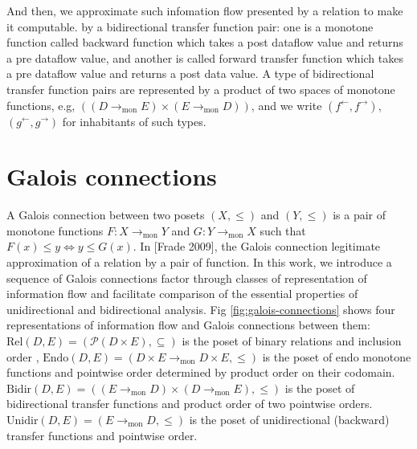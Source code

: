 \documentclass{easychair}
\theoremstyle{definition}
\newcommand{\Pow}{\mathcal{P}}
\newcommand{\Rel}{\mathrm{Rel}}
\newcommand{\Endo}{\mathrm{Endo}}
\newcommand{\Bidir}{\mathrm{Bidir}}
\newcommand{\Unidir}{\mathrm{Unidir}}
\newcommand{\tomon}{\to_{\mathrm{mon}}}
\newcommand{\ff}{{f^{\rightarrow}}}
\newcommand{\fb}{{f^{\leftarrow}}}
\newcommand{\gf}{{g^{\rightarrow}}}
\newcommand{\gb}{{g^{\leftarrow}}}
\begin{document}
And then, we approximate such infomation flow presented by a relation to make it computable.
by a bidirectional transfer function pair: one is a monotone function
called backward function which takes a post dataflow value and returns a
pre dataflow value, and another is called forward transfer function
which takes a pre dataflow value and returns a post data value. A type
of bidirectional transfer function pairs are represented by a product of
two spaces of monotone functions, e.g, $((D \tomon E) \times (E \tomon D))$,
and we write $(\fb, \ff)$, $(\gb , \gf)$ for inhabitants of such types.

\section{Galois connections}
A Galois connection between two posets $(X , \leq)$ and $(Y , \leq)$ is a pair
of monotone functions $F : X \tomon Y$ and $G : Y \tomon X$ such that $F(x) \leq y \iff y \leq G(x)$.
In [Frade 2009], the Galois connection legitimate approximation of a
relation by a pair of function. In this work, we introduce a sequence of
Galois connections factor through classes of representation of
information flow and facilitate comparison of the essential properties
of unidirectional and bidirectional analysis. Fig \ref{fig:galois-connections} shows four representations of information
flow and Galois connections between them: $\Rel(D, E)= (\Pow(D \times E), \subseteq)$
is the poset of binary relations and inclusion order , $\Endo(D , E) = (D \times E \tomon D \times E, \leq)$
is the poset of endo monotone functions and pointwise order determined
by product order on their codomain. $\Bidir(D , E) = ((E \tomon D) \times (D \tomon E), \leq)$ is the poset of bidirectional transfer functions and product
order of two pointwise orders. $\Unidir(D , E) = (E \tomon D , \leq)$ is the poset
of unidirectional (backward) transfer functions and pointwise order.
\end{document}
